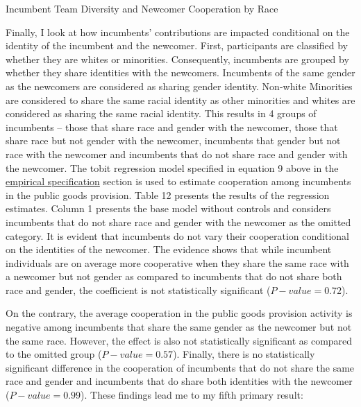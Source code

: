 \begin{table}[H]
 \captionsetup{justification=raggedright,singlelinecheck=false}
\caption{Incumbent Team Diversity and Newcomer Cooperation by Race } \label{tab:table6}
    \begin{center}
        
    \end{center}
\end{table}





\hspace  *{0mm} Finally, I look at how incumbents’ contributions are impacted conditional on the identity of the incumbent and the newcomer. First, participants are classified by whether they are whites or minorities. Consequently, incumbents are grouped by whether they share identities with the newcomers. Incumbents of the same gender as the newcomers are considered as sharing gender identity. Non-white Minorities are considered to share the same racial identity as other minorities and whites are considered as sharing the same racial identity. This results in 4 groups of incumbents – those that share race and gender with the newcomer, those that share race but not gender with the newcomer, incumbents that gender but not race with the newcomer and incumbents that do not share race and gender with the newcomer. The tobit regression model specified in equation 9 above in the \hyperref[subsec:Specification]{empirical specification} section is used to estimate cooperation among incumbents in the public goods provision. Table 12 presents the results of the regression estimates. Column 1 presents the base model without controls and considers incumbents that do not share race and gender with the newcomer as the omitted category. It is evident that incumbents do not vary their cooperation conditional on the identities of the newcomer. The evidence shows that while incumbent individuals are on average more cooperative when they share the same race with a newcomer but not gender as compared to incumbents that do not share both race and gender, the coefficient is not statistically significant ($P-value=0.72$).

On the contrary, the average cooperation in the public goods provision activity is negative among incumbents that share the same gender as the newcomer but not the same race. However, the effect is also not statistically significant as compared to the omitted group ($P-value=0.57$). Finally, there is no statistically significant difference in the cooperation of incumbents that do not share the same race and gender and incumbents that do share both identities with the newcomer ($P-value=0.99$). These findings lead me to my fifth primary result:

